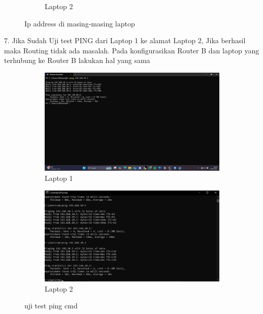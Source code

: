 \begin{figure}[H]
\begin{subfigure}[b]{0.3\linewidth}
      \caption{Laptop 2}
    \end{subfigure}
    \caption{Ip address di masing-masing laptop}
\end{figure}

7. Jika Sudah Uji test PING dari Laptop 1 ke alamat Laptop 2, Jika berhasil maka Routing tidak ada masalah. Pada konfigurasikan Router B dan laptop yang terhubung ke Router B lakukan hal yang sama
\begin{figure}[H]
    \centering
    \begin{subfigure}[b]{0.3\linewidth}
      \centering
      \includegraphics[width=\linewidth]{image/bridge11.jpg}
      \caption{Laptop 1}
    \end{subfigure}
    \hspace{1cm}
    \begin{subfigure}[b]{0.3\linewidth}
      \centering
      \includegraphics[width=\linewidth]{image/bridge9.png}
      \caption{Laptop 2}
    \end{subfigure}
    \caption{uji test ping cmd}
\end{figure}


